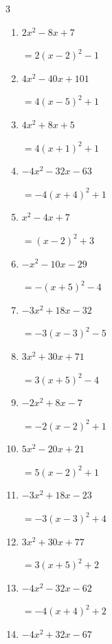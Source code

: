\begin{multicols}{3}
\begin{enumerate}
        $=-5\left( x+2\right)^{2}-2$

  \item $2x^{2}-8x+7$

        $=2\left( x-2\right)^{2}-1$

  \item $4x^{2}-40x+101$

        $=4\left( x-5\right)^{2}+1$

  \item $4x^{2}+8x+5$

        $=4\left( x+1\right)^{2}+1$

  \item $-4x^{2}-32x-63$

        $=-4\left( x+4\right)^{2}+1$

  \item $x^{2}-4x+7$

        $=\left( x-2\right)^{2}+3$

  \item $-x^{2}-10x-29$

        $=-\left( x+5\right)^{2}-4$

  \item $-3x^{2}+18x-32$

        $=-3\left( x-3\right)^{2}-5$

\columnbreak %

  \item $3x^{2}+30x+71$

        $=3\left( x+5\right)^{2}-4$

  \item $-2x^{2}+8x-7$

        $=-2\left( x-2\right)^{2}+1$

  \item $5x^{2}-20x+21$

        $=5\left( x-2\right)^{2}+1$

  \item $-3x^{2}+18x-23$

        $=-3\left( x-3\right)^{2}+4$

  \item $3x^{2}+30x+77$

        $=3\left( x+5\right)^{2}+2$

  \item $-4x^{2}-32x-62$

        $=-4\left( x+4\right)^{2}+2$

  \item $-4x^{2}+32x-67$


\end{enumerate}
\end{multicols}
